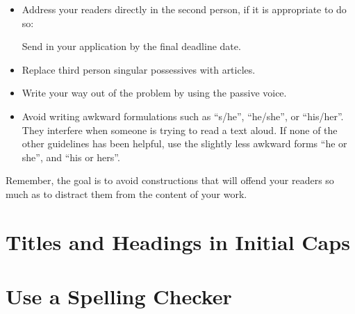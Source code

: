 \begin{itemize}



\item Address your readers directly in the second person, if it is
  appropriate to do so:

{Send in your application by the final deadline date.}




\item Replace third person singular possessives with articles.




\item Write your way out of the problem by using the passive voice.




\item Avoid writing awkward formulations such as \enquote{s/he}, \enquote{he/she},
  or \enquote{his/her}.  They interfere when someone is trying to read a
  text aloud.  If none of the other guidelines has been helpful, use
  the slightly less awkward forms \enquote{he or she}, and \enquote{his or hers}.

\end{itemize}
Remember, the goal is to avoid constructions that will offend your
readers so much as to distract them from the content of your work.




\section{Titles and Headings in Initial Caps}









\section{Use a Spelling Checker}

